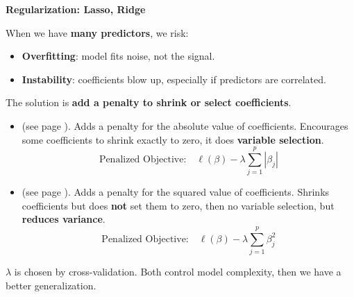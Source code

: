 \begin{flushleft}
    \textcolor{Green3}{ \textbf{Regularization: Lasso, Ridge}}
\end{flushleft}
When we have \textbf{many predictors}, we risk:
\begin{itemize}
    \item \textbf{Overfitting}: model fits noise, not the signal.
    \item \textbf{Instability}: coefficients blow up, especially if predictors are correlated.
\end{itemize}
The solution is \textbf{add a penalty to shrink or select coefficients}.
\begin{itemize}
    \item {} (see page \pageref{paragraph: Lasso}). Adds a penalty for the absolute value of coefficients. Encourages some coefficients to shrink exactly to zero, it does \textbf{variable selection}.
    \begin{equation*}
        \text{Penalized Objective:} \quad  \ell(\beta) - \lambda \sum_{j=1}^p \left|\beta_j\right|
    \end{equation*}

    \item {} (see page \pageref{paragraph: Ridge Regression}). Adds a penalty for the squared value of coefficients. Shrinks coefficients but does \textbf{not} set them to zero, then no variable selection, but \textbf{reduces variance}.
    \begin{equation*}
        \text{Penalized Objective:} \quad \ell(\beta) - \lambda \displaystyle\sum_{j=1}^p \beta_j^2
    \end{equation*}
\end{itemize}
$\lambda$ is chosen by cross-validation. Both control model complexity, then we have a better generalization.

